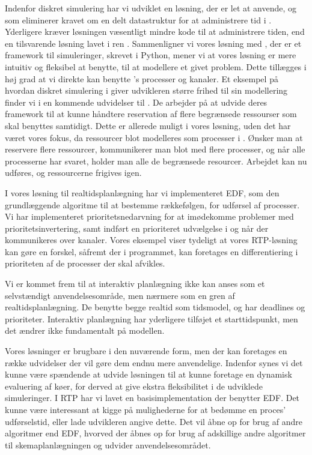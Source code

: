 Indenfor diskret simulering har vi udviklet en løsning, der er let at anvende, og som eliminerer kravet om en delt datastruktur for at administrere tid i \pycsp. Yderligere kræver løsningen væsentligt mindre kode til at administrere tiden, end en tilsvarende løsning lavet i ren \pycsp. 
Sammenligner vi vores løsning med \simpy, der er et framework til simuleringer, skrevet i Python, mener vi at vores løsning er mere intuitiv og fleksibel at benytte, til at modellere et givet problem. Dette tillægges i høj grad at vi direkte kan benytte \pycsp's processer og kanaler. Et eksempel på hvordan diskret simulering i \pycsp giver udvikleren større frihed til sin modellering finder vi i en kommende udvidelser til \simpy. De arbejder  på at udvide deres framework til at kunne håndtere reservation af flere begrænsede ressourser som skal benyttes samtidigt. Dette er allerede muligt i vores løsning, uden det har været vores fokus, da ressourcer blot modelleres som processer i \pycsp. Ønsker man at reservere flere ressourcer, kommunikerer man blot med flere processer, og når alle processerne har svaret, holder man alle de begrænsede resourcer. Arbejdet kan nu udføres, og ressourcerne frigives igen. 

I vores løsning til realtidsplanlægning har vi implementeret EDF, som den grundlæggende algoritme til at bestemme rækkefølgen, for udførsel af processer. Vi har implementeret prioritetsnedarvning for at imødekomme problemer med prioritetsinvertering, samt indført en prioriteret udvælgelse i  og når der kommunikeres over kanaler. Vores eksempel viser tydeligt at vores RTP-løsning kan gøre en forskel, såfremt der i programmet, kan foretages en differentiering i prioriteten af de processer der skal afvikles. 

Vi er kommet frem til at interaktiv planlægning ikke kan anses som et selvstændigt anvendelsesområde, men nærmere som en gren af realtidsplanlægning. De benytte begge realtid som tidsmodel, og har deadlines og prioriteter. Interaktiv planlægning har yderligere tilføjet et starttidspunkt, men det ændrer ikke fundamentalt på modellen. 

Vores løsninger er brugbare i den nuværende form, men der kan foretages en række udvidelser der vil gøre dem endnu mere anvendelige. 
Indenfor \des synes vi det kunne være spændende at udvide løsningen til at kunne foretage en dynamisk evaluering af køer, for derved at give ekstra fleksibilitet i de udviklede simuleringer. I RTP har vi lavet en basisimplementation der benytter EDF. Det kunne være interessant at kigge på mulighederne for at bedømme en proces' udførselstid, eller lade udvikleren angive dette. Det vil åbne op for brug af andre algoritmer end EDF, hvorved der åbnes op for brug af adskillige andre algoritmer til skemaplanlægningen og udvider anvendelsesområdet.  







